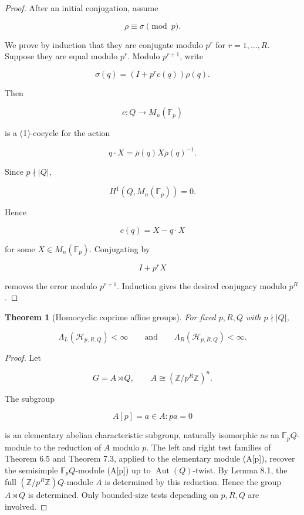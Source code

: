 \documentclass[11pt]{article}
\newtheorem{theorem}{Theorem}[section]
\begin{document}
\begin{proof}
After an initial conjugation, assume

\[
\rho\equiv\sigma\pmod p.
\]

We prove by induction that they are conjugate modulo $p^r$ for $r=1,\ldots,R$. Suppose they are equal modulo $p^r$. Modulo $p^{r+1}$, write

\[
\sigma(q)=
(I+p^r c(q))\rho(q).
\]

Then

\[
c:Q\to M_n(\mathbb F_p)
\]

is a (1)-cocycle for the action

\[
q\cdot X=\bar\rho(q)X\bar\rho(q)^{-1}.
\]

Since $p\nmid |Q|$,

\[
H^1(Q,M_n(\mathbb F_p))=0.
\]

Hence

\[
c(q)=X-q\cdot X
\]

for some $X\in M_n(\mathbb F_p)$. Conjugating by

\[
I+p^rX
\]

removes the error modulo $p^{r+1}$. Induction gives the desired conjugacy modulo $p^R$.

\end{proof}

\begin{theorem}[Homocyclic coprime affine groups]
For fixed $p,R,Q$ with $p\nmid |Q|$,

\[
\Lambda_L(\mathcal H_{p,R,Q})<\infty
\qquad\text{and}\qquad
\Lambda_R(\mathcal H_{p,R,Q})<\infty.
\]

\end{theorem}

\begin{proof}
Let

\[
G=A\rtimes Q,
\qquad
A\cong(\mathbb Z/p^R\mathbb Z)^n.
\]

The subgroup

\[
A[p]={a\in A:pa=0}
\]

is an elementary abelian characteristic subgroup, naturally isomorphic as an $\mathbb F_pQ$-module to the reduction of $A$ modulo $p$. The left and right test families of Theorem 6.5 and Theorem 7.3, applied to the elementary module (A[p]), recover the semisimple $\mathbb F_pQ$-module (A[p]) up to $\operatorname{Aut}(Q)$-twist. By Lemma 8.1, the full $(\mathbb Z/p^R\mathbb Z)Q$-module $A$ is determined by this reduction. Hence the group $A\rtimes Q$ is determined. Only bounded-size tests depending on $p,R,Q$ are involved.

\end{proof}
\end{document}
